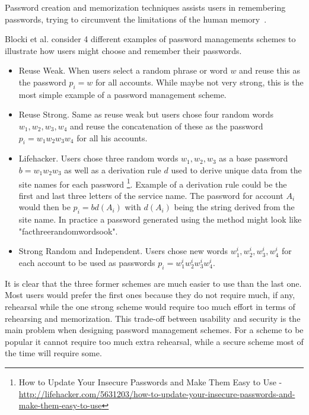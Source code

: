 Password creation and memorization techniques assists users in remembering passwords, trying to circumvent the limitations of the human memory~\cite{human-memory}. 
\par Blocki et al. \cite{naturally-rehearsing} consider 4 different examples of password managements schemes to illustrate how users might choose and remember their passwords.
\begin{itemize}
    \item{ Reuse Weak. } When users select a random phrase or word $w$ and reuse this as the password $p_i=w$ for all accounts. While maybe not very strong, this is the most simple example of a password management scheme.
    \item{ Reuse Strong. } Same as reuse weak but users chose four random words $w_1,w_2,w_3,w_4$ and reuse the concatenation of these as the password $p_i = w_1w_2w_3w_4$ for all his accounts.
    \item{Lifehacker.} Users chose three random words $w_1, w_2, w_3$ as a base password $b=w_1w_2w_3$ as well as a derivation rule $d$ used to derive unique data from the site names for each password \footnote{How to Update Your Insecure Passwords and Make Them Easy to Use - \url{http://lifehacker.com/5631203/how-to-update-your-insecure-passwords-and-make-them-easy-to-use}}. Example of a derivation rule could be the first and last three letters of the service name. The password for account $A_i$ would then be $p_i = b d(A_i)$ with $d(A_i)$ being the string derived from the site name. In practice a password generated using the method might look like "facthreerandomwordsook". 
    \item{Strong Random and Independent.} Users chose new words $w^i_1, w^i_2, w^i_3, w^i_4$ for each account to be used as passwords $p_i = w^i_1w^i_2w^i_3w^i_4$.
\end{itemize}
It is clear that the three former schemes are much easier to use than the last one. Most users would prefer the first ones because they do not require much, if any, rehearsal while the one strong scheme would require too much effort in terms of rehearsing and memorization. This trade-off between usability and security is the main problem when designing password management schemes. For a scheme to be popular it cannot require too much extra rehearsal, while a secure scheme most of the time will require some.



